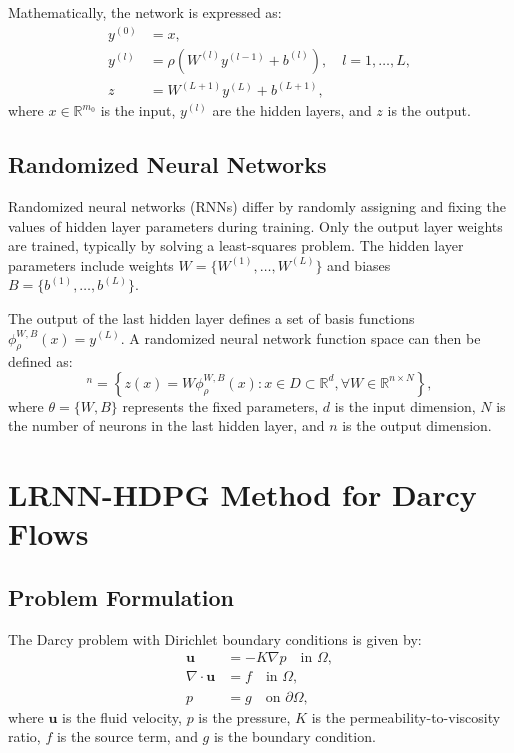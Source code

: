 \documentclass[11pt,a4paper]{article}
\begin{document}
Mathematically, the network is expressed as:
\begin{align}
y^{(0)} &= x, \\
y^{(l)} &= \rho(W^{(l)}y^{(l-1)} + b^{(l)}), \quad l = 1, \ldots, L, \\
z &= W^{(L+1)}y^{(L)} + b^{(L+1)},
\end{align}
where $x \in \mathbb{R}^{m_0}$ is the input, $y^{(l)}$ are the hidden layers, and $z$ is the output.

\subsection{Randomized Neural Networks}

Randomized neural networks (RNNs) differ by randomly assigning and fixing the values of hidden layer parameters during training. Only the output layer weights are trained, typically by solving a least-squares problem. The hidden layer parameters include weights $W = \{W^{(1)}, \ldots, W^{(L)}\}$ and biases $B = \{b^{(1)}, \ldots, b^{(L)}\}$.

The output of the last hidden layer defines a set of basis functions $\phi^{W,B}_\rho(x) = y^{(L)}$. A randomized neural network function space can then be defined as:
\begin{equation}
[N^\theta_\rho(D)]^n = \left\{z(x) = W\phi^{W,B}_\rho(x) : x \in D \subset \mathbb{R}^d, \forall W \in \mathbb{R}^{n \times N}\right\},
\end{equation}
where $\theta = \{W, B\}$ represents the fixed parameters, $d$ is the input dimension, $N$ is the number of neurons in the last hidden layer, and $n$ is the output dimension.

\section{LRNN-HDPG Method for Darcy Flows}

\subsection{Problem Formulation}

The Darcy problem with Dirichlet boundary conditions is given by:
\begin{align}
\mathbf{u} &= -K\nabla p \quad \text{in } \Omega, \\
\nabla \cdot \mathbf{u} &= f \quad \text{in } \Omega, \\
p &= g \quad \text{on } \partial\Omega,
\end{align}
where $\mathbf{u}$ is the fluid velocity, $p$ is the pressure, $K$ is the permeability-to-viscosity ratio, $f$ is the source term, and $g$ is the boundary condition.
\end{document}
